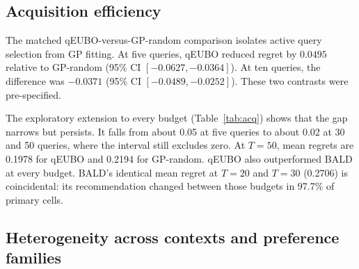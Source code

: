 \documentclass[preprint,12pt]{elsarticle}
\begin{document}
\subsection{Acquisition efficiency}

The matched qEUBO-versus-GP-random comparison isolates active query selection from GP fitting. At five queries, qEUBO reduced regret by $0.0495$ relative to GP-random (95\% CI $[-0.0627,-0.0364]$). At ten queries, the difference was $-0.0371$ (95\% CI $[-0.0489,-0.0252]$). These two contrasts were pre-specified.

The exploratory extension to every budget (Table~\ref{tab:acq}) shows that the gap narrows but persists. It falls from about 0.05 at five queries to about 0.02 at 30 and 50 queries, where the interval still excludes zero. At $T=50$, mean regrets are 0.1978 for qEUBO and 0.2194 for GP-random. qEUBO also outperformed BALD at every budget. BALD's identical mean regret at $T=20$ and $T=30$ (0.2706) is coincidental: its recommendation changed between those budgets in 97.7\% of primary cells.

\begin{table}[!htbp]
\centering
\caption{Matched acquisition differences in normalised regret (listener-level 95\% bootstrap CIs; pre-specified families). Only qEUBO$-$GP-random at $T=5$ and $T=10$ was pre-specified; other entries are exploratory. The last row counts listeners for whom qEUBO had lower regret than GP-random.}
\label{tab:acq}
\end{table}

\subsection{Heterogeneity across contexts and preference families}
\end{document}
